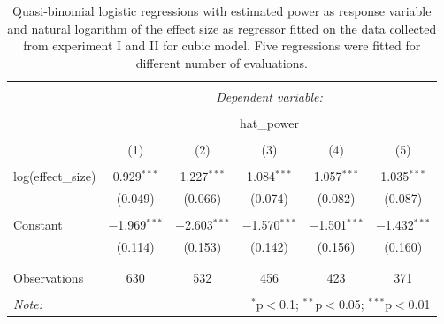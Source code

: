 \documentclass{monashthesis}
\theoremstyle{definition}
\theoremstyle{definition}
\theoremstyle{definition}
\theoremstyle{definition}
\theoremstyle{remark}
\begin{document}
\begin{table}[!htbp] \centering 
  \caption{Quasi-binomial logistic regressions with estimated power as response variable and natural logarithm of the effect size as regressor fitted on the data collected from experiment I and II for cubic model. Five regressions were fitted for different number of evaluations.} 
  \label{tab:powerglmcubic} 
\begin{tabular}{@{\extracolsep{5pt}}lccccc} 
\\[-1.8ex]\hline 
\hline \\[-1.8ex] 
 & \multicolumn{5}{c}{\textit{Dependent variable:}} \\ 
\cline{2-6} 
\\[-1.8ex] & \multicolumn{5}{c}{hat\_power} \\ 
\\[-1.8ex] & (1) & (2) & (3) & (4) & (5)\\ 
\hline \\[-1.8ex] 
 log(effect\_size) & 0.929$^{***}$ & 1.227$^{***}$ & 1.084$^{***}$ & 1.057$^{***}$ & 1.035$^{***}$ \\ 
  & (0.049) & (0.066) & (0.074) & (0.082) & (0.087) \\ 
  & & & & & \\ 
 Constant & $-$1.969$^{***}$ & $-$2.603$^{***}$ & $-$1.570$^{***}$ & $-$1.501$^{***}$ & $-$1.432$^{***}$ \\ 
  & (0.114) & (0.153) & (0.142) & (0.156) & (0.160) \\ 
  & & & & & \\ 
\hline \\[-1.8ex] 
Observations & 630 & 532 & 456 & 423 & 371 \\ 
\hline 
\hline \\[-1.8ex] 
\textit{Note:}  & \multicolumn{5}{r}{$^{*}$p$<$0.1; $^{**}$p$<$0.05; $^{***}$p$<$0.01} \\ 
\end{tabular} 
\end{table}
\end{document}

